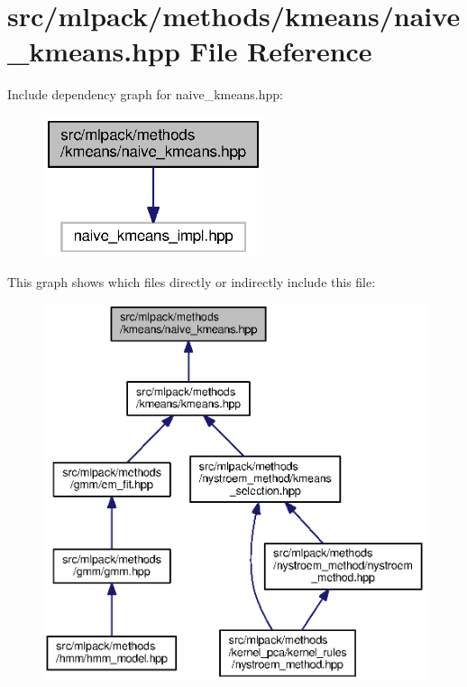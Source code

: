 \section{src/mlpack/methods/kmeans/naive\+\_\+kmeans.hpp File Reference}
\label{naive__kmeans_8hpp}
Include dependency graph for naive\+\_\+kmeans.\+hpp\+:
\nopagebreak
\begin{figure}[H]
\begin{center}
\leavevmode
\includegraphics[width=183pt]{naive__kmeans_8hpp__incl}
\end{center}
\end{figure}
This graph shows which files directly or indirectly include this file\+:
\nopagebreak
\begin{figure}[H]
\begin{center}
\leavevmode
\includegraphics[width=350pt]{naive__kmeans_8hpp__dep__incl}
\end{center}
\end{figure}
